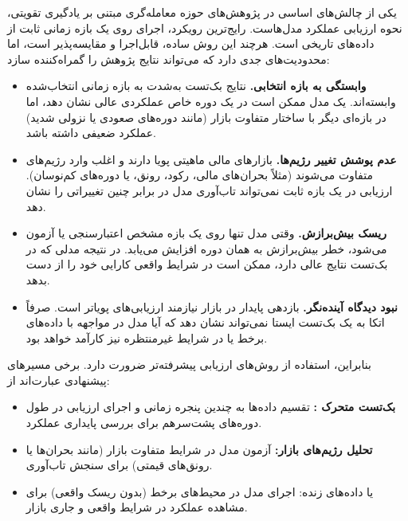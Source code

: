 \documentclass[12pt, a4paper]{report}
\begin{document}
یکی از چالش‌های اساسی در پژوهش‌های حوزه معامله‌گری مبتنی بر یادگیری تقویتی، نحوه ارزیابی عملکرد مدل‌هاست.  
رایج‌ترین رویکرد، اجرای  روی یک بازه زمانی ثابت از داده‌های تاریخی است.  
هرچند این روش ساده، قابل‌اجرا و مقایسه‌پذیر است، اما محدودیت‌های جدی دارد که می‌تواند نتایج پژوهش را گمراه‌کننده سازد:  

\begin{itemize}
    \item \textbf{وابستگی به بازه انتخابی.} نتایج بک‌تست به‌شدت به بازه زمانی انتخاب‌شده وابسته‌اند. یک مدل ممکن است در یک دوره خاص عملکردی عالی نشان دهد، اما در بازه‌ای دیگر با ساختار متفاوت بازار (مانند دوره‌های صعودی یا نزولی شدید) عملکرد ضعیفی داشته باشد.  

    \item \textbf{عدم پوشش تغییر رژیم‌ها.} بازارهای مالی ماهیتی پویا دارند و اغلب وارد رژیم‌های متفاوت می‌شوند (مثلاً بحران‌های مالی، رکود، رونق، یا دوره‌های کم‌نوسان). ارزیابی در یک بازه ثابت نمی‌تواند تاب‌آوری مدل در برابر چنین تغییراتی را نشان دهد.  

    \item \textbf{ریسک بیش‌برازش.} وقتی مدل تنها روی یک بازه مشخص اعتبارسنجی یا آزمون می‌شود، خطر بیش‌برازش به همان دوره افزایش می‌یابد. در نتیجه مدلی که در بک‌تست نتایج عالی دارد، ممکن است در شرایط واقعی کارایی خود را از دست بدهد.  

    \item \textbf{نبود دیدگاه آینده‌نگر.} بازدهی پایدار در بازار نیازمند ارزیابی‌های پویاتر است. صرفاً اتکا به یک بک‌تست ایستا نمی‌تواند نشان دهد که آیا مدل در مواجهه با داده‌های برخط یا در شرایط غیرمنتظره نیز کارآمد خواهد بود.  
\end{itemize}

بنابراین، استفاده از روش‌های ارزیابی پیشرفته‌تر ضرورت دارد. برخی مسیرهای پیشنهادی عبارت‌اند از:  

\begin{itemize}
    \item \textbf{بک‌تست متحرک :} تقسیم داده‌ها به چندین پنجره زمانی و اجرای ارزیابی در طول دوره‌های پشت‌سرهم برای بررسی پایداری عملکرد.  
    \item \textbf{تحلیل رژیم‌های بازار:} آزمون مدل در شرایط متفاوت بازار (مانند بحران‌ها یا رونق‌های قیمتی) برای سنجش تاب‌آوری.  
    \item {} یا داده‌های زنده: اجرای مدل در محیط‌های برخط (بدون ریسک واقعی) برای مشاهده عملکرد در شرایط واقعی و جاری بازار.  
\end{itemize}
\end{document}
